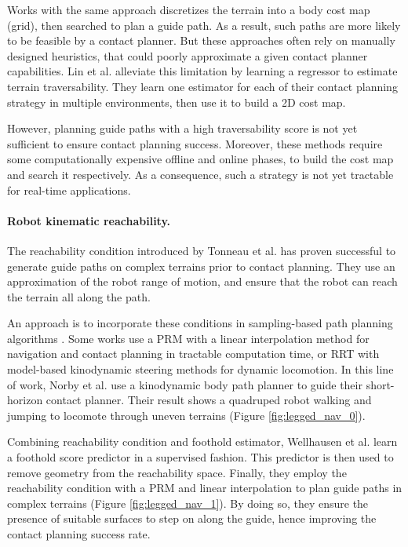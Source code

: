 Works with the same approach \cite{winkler_2014, wermelinger_2016} discretizes the terrain into a body cost map (grid), then searched to plan a guide path. As a result, such paths are more likely to be feasible by a contact planner.
But these approaches often rely on manually designed heuristics, that could poorly approximate a given contact planner capabilities.
Lin et al. \cite{lin_traversability_2018} alleviate this limitation by learning a regressor to estimate terrain traversability. They learn one estimator for each of their contact planning strategy in multiple environments, then use it to build a 2D cost map.

However, planning guide paths with a high traversability score is not yet sufficient to ensure contact planning success.
Moreover, these methods require some computationally expensive offline and online phases, to build the cost map and search it respectively. 
As a consequence, such a strategy is not yet tractable for real-time applications.


\paragraph{Robot kinematic reachability.}
The reachability condition introduced by Tonneau et al. \cite{RB-PRM} has proven successful to generate guide paths on complex terrains prior to contact planning.
They use an approximation of the robot range of motion, and ensure that the robot can reach the terrain all along the path.

An approach is to incorporate these conditions in sampling-based path planning algorithms \cite{sl1m_v2, fanny_mip_solo}.
Some works use a PRM with a linear interpolation method \cite{AcyclicCP} for navigation and contact planning in tractable computation time, or RRT with model-based kinodynamic steering methods \cite{kinodynamic_sm_2017} for dynamic locomotion.
In this line of work, Norby et al. \cite{norby_skd_2022} use a kinodynamic body path planner to guide their short-horizon contact planner. Their result shows a quadruped robot walking and jumping to locomote through uneven terrains (Figure \ref{fig:legged_nav_0}).

Combining reachability condition and foothold estimator, Wellhausen et al. \cite{rough_terrain_reachability_hutter_2021} learn a foothold score predictor in a supervised fashion. This predictor is then used to remove geometry from the reachability space.
Finally, they employ the reachability condition with a PRM and linear interpolation to plan guide paths in complex terrains (Figure \ref{fig:legged_nav_1}).
By doing so, they ensure the presence of suitable surfaces to step on along the guide, hence improving the contact planning success rate.

